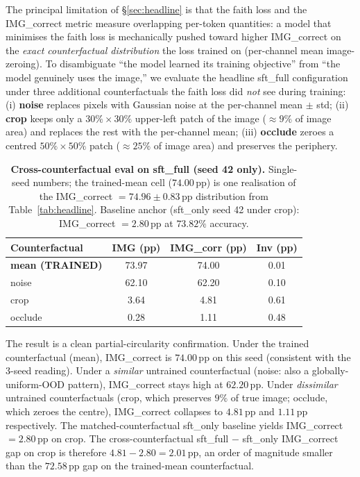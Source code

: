 \documentclass{article}
\begin{document}
The principal limitation of \S\ref{sec:headline} is that the faith loss and
the IMG\_correct metric measure overlapping per-token quantities: a model
that minimises the faith loss is mechanically pushed toward higher
IMG\_correct on the \emph{exact counterfactual distribution} the loss
trained on (per-channel mean image-zeroing). To disambiguate ``the model
learned its training objective'' from ``the model genuinely uses the
image,'' we evaluate the headline sft\_full configuration under three
additional counterfactuals the faith loss did \emph{not} see during
training: (i) \textbf{noise} replaces pixels with Gaussian noise at the
per-channel mean $\pm$ std; (ii) \textbf{crop} keeps only a $30\% \times
30\%$ upper-left patch of the image ($\approx 9\%$ of image area) and
replaces the rest with the per-channel mean; (iii) \textbf{occlude}
zeroes a centred $50\% \times 50\%$ patch ($\approx 25\%$ of image area)
and preserves the periphery.

\begin{table}[t]
\centering
\small
\caption{\textbf{Cross-counterfactual eval on sft\_full (seed 42 only).}
Single-seed numbers; the trained-mean cell ($74.00$\,pp) is one realisation
of the IMG\_correct $= 74.96 \pm 0.83$\,pp distribution from
Table~\ref{tab:headline}. Baseline anchor (sft\_only seed 42 under crop):
IMG\_correct $= 2.80$\,pp at $73.82\%$ accuracy.}
\label{tab:crosscf}
\setlength{\tabcolsep}{4.0pt}
\begin{tabular}{lccc}
\toprule
\textbf{Counterfactual} & \textbf{IMG (pp)} & \textbf{IMG\_corr (pp)} & \textbf{Inv (pp)}\\
\midrule
\textbf{mean (TRAINED)} & 73.97 & 74.00 & 0.01 \\
noise                   & 62.10 & 62.20 & 0.10 \\
crop                    & \phantom{0}3.64 & \phantom{0}4.81 & 0.61 \\
occlude                 & \phantom{0}0.28 & \phantom{0}1.11 & 0.48 \\
\bottomrule
\end{tabular}
\end{table}

The result is a clean partial-circularity confirmation. Under the trained
counterfactual (mean), IMG\_correct is $74.00$\,pp on this seed (consistent
with the 3-seed reading). Under a \emph{similar} untrained counterfactual
(noise: also a globally-uniform-OOD pattern), IMG\_correct stays high at
$62.20$\,pp. Under \emph{dissimilar} untrained counterfactuals (crop, which
preserves $9\%$ of true image; occlude, which zeroes the centre),
IMG\_correct collapses to $4.81$\,pp and $1.11$\,pp respectively. The
matched-counterfactual sft\_only baseline yields IMG\_correct $= 2.80$\,pp
on crop. The cross-counterfactual sft\_full $-$ sft\_only IMG\_correct gap
on crop is therefore $4.81 - 2.80 = 2.01$\,pp, an order of magnitude
smaller than the $72.58$\,pp gap on the trained-mean counterfactual.
\end{document}
